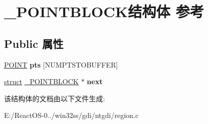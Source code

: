 \hypertarget{struct___p_o_i_n_t_b_l_o_c_k}{}\section{\+\_\+\+P\+O\+I\+N\+T\+B\+L\+O\+C\+K结构体 参考}
\label{struct___p_o_i_n_t_b_l_o_c_k}
\subsection*{Public 属性}
\begin{DoxyCompactItemize}
\item 
\mbox{\label{struct___p_o_i_n_t_b_l_o_c_k_afa0692cad0032d6fae18f799f17e271a}} 
\hyperlink{structtag_p_o_i_n_t}{P\+O\+I\+NT} {\bfseries pts} \mbox{[}N\+U\+M\+P\+T\+S\+T\+O\+B\+U\+F\+F\+ER\mbox{]}
\item 
\mbox{\label{struct___p_o_i_n_t_b_l_o_c_k_aa10ff58e7baf9db25cacf2ba37e25d83}} 
\hyperlink{interfacestruct}{struct} \hyperlink{struct___p_o_i_n_t_b_l_o_c_k}{\+\_\+\+P\+O\+I\+N\+T\+B\+L\+O\+CK} $\ast$ {\bfseries next}
\end{DoxyCompactItemize}


该结构体的文档由以下文件生成\+:\begin{DoxyCompactItemize}
\item 
E\+:/\+React\+O\+S-\/0../win32ss/gdi/ntgdi/region.\+c\end{DoxyCompactItemize}
